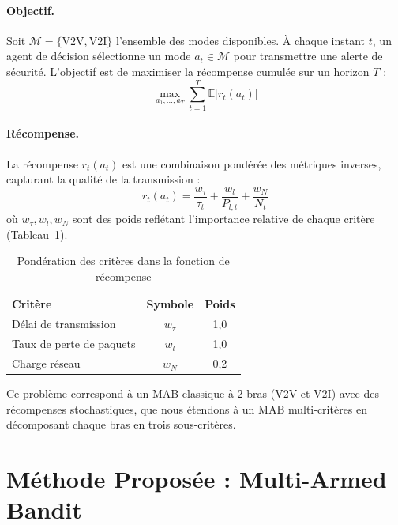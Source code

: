 \documentclass[12pt,a4paper]{article}
\begin{document}
\paragraph{Objectif.}
Soit $\mathcal{M} = \{\text{V2V}, \text{V2I}\}$ l'ensemble des modes disponibles.
À chaque instant $t$, un agent de décision sélectionne un mode $a_t \in \mathcal{M}$
pour transmettre une alerte de sécurité. L'objectif est de maximiser la récompense
cumulée sur un horizon $T$ :
\begin{equation}
  \max_{a_1,\ldots,a_T} \sum_{t=1}^T \mathbb{E}\bigl[r_t(a_t)\bigr]
\end{equation}

\paragraph{Récompense.}
La récompense $r_t(a_t)$ est une combinaison pondérée des métriques inverses,
capturant la qualité de la transmission :
\begin{equation}
  r_t(a_t) = \frac{w_\tau}{\tau_t} + \frac{w_l}{P_{l,t}} + \frac{w_N}{N_t}
\end{equation}
où $w_\tau, w_l, w_N$ sont des poids reflétant l'importance relative de chaque
critère (Tableau~\ref{tab:weights}).

\begin{table}[H]
\centering
\caption{Pondération des critères dans la fonction de récompense}
\label{tab:weights}
\begin{tabular}{@{}lcc@{}}
\toprule
\textbf{Critère} & \textbf{Symbole} & \textbf{Poids} \\
\midrule
Délai de transmission & $w_\tau$ & 1{,}0 \\
Taux de perte de paquets & $w_l$ & 1{,}0 \\
Charge réseau & $w_N$ & 0{,}2 \\
\bottomrule
\end{tabular}
\end{table}

Ce problème correspond à un MAB classique à 2 bras (V2V et V2I) avec des
récompenses stochastiques, que nous étendons à un MAB multi-critères en
décomposant chaque bras en trois sous-critères.

\section{Méthode Proposée : Multi-Armed Bandit}
\label{sec:methode}
\end{document}
